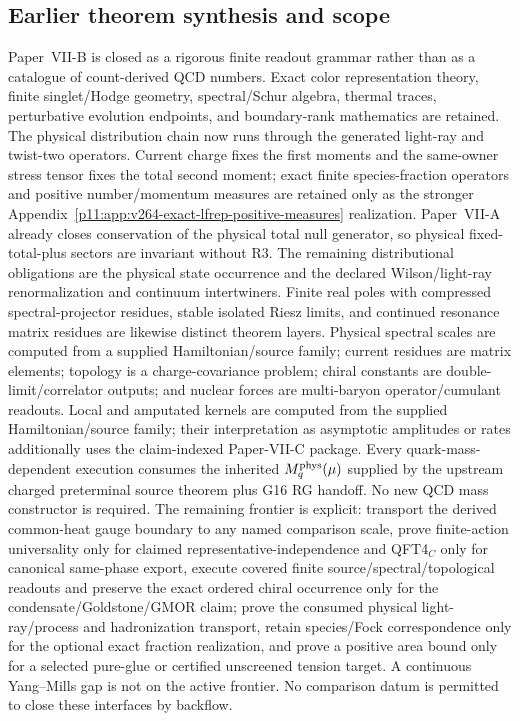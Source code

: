 \documentclass[12pt,a4paper]{article}
\begin{document}
\subsection{Earlier theorem synthesis and scope}
Paper~VII-B is closed as a rigorous finite readout grammar rather than as a
catalogue of count-derived QCD numbers.  Exact color representation theory,
finite singlet/Hodge geometry, spectral/Schur algebra, thermal traces,
perturbative evolution endpoints, and boundary-rank mathematics are retained.
The physical distribution chain now runs through the generated light-ray and
twist-two operators.  Current charge fixes the first moments and the same-owner
stress tensor fixes the total second moment; exact finite species-fraction
operators and positive number/momentum measures are retained only as the
stronger Appendix~\ref{p11:app:v264-exact-lfrep-positive-measures} realization.
Paper~VII-A already closes conservation of the physical total null generator,
so physical fixed-total-plus sectors are invariant without R3.  The remaining
distributional obligations are the physical state occurrence and the declared
Wilson/light-ray renormalization and continuum intertwiners.  Finite
real poles with compressed spectral-projector residues, stable isolated Riesz
limits, and continued resonance
matrix residues are likewise distinct theorem layers.  Physical spectral
scales are computed from a supplied Hamiltonian/source family; current residues
are matrix elements; topology is a charge-covariance problem; chiral constants
are double-limit/correlator outputs; and nuclear forces are multi-baryon
operator/cumulant readouts.  Local and amputated kernels are computed from the
supplied Hamiltonian/source family; their interpretation as asymptotic
amplitudes or rates additionally uses the claim-indexed Paper-VII-C package.
Every quark-mass-dependent execution consumes the inherited
$M_q^{\rm phys}(\mu)$ supplied by the upstream charged preterminal source theorem plus G16 RG
handoff.  No new QCD mass constructor is required.  The remaining frontier is
explicit: transport the derived common-heat gauge boundary to any named
comparison scale, prove finite-action universality only for claimed representative-independence and QFT4$_C$ only for canonical same-phase export, execute covered finite source/spectral/topological readouts and preserve the
exact ordered chiral occurrence only for the condensate/Goldstone/GMOR claim;
prove the consumed physical light-ray/process and hadronization transport,
retain species/Fock correspondence only for the optional exact fraction
realization, and prove a positive area bound only for a selected pure-glue or
certified unscreened tension target.  A continuous
Yang--Mills gap is not on the active frontier.  No comparison datum is permitted
to close these interfaces by backflow.
\end{document}
